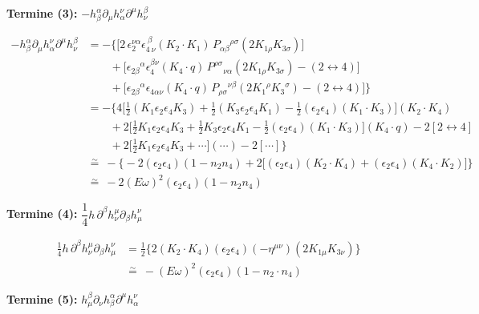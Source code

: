 \documentclass[11pt]{article}
\begin{document}
\bigskip
\noindent\textbf{Termine (3):} $-h_\beta^\alpha\partial_\mu h_\alpha^\nu\partial^\mu h_\nu^\beta$

\begin{align*}
-h_\beta^\alpha\partial_\mu h_\alpha^\nu\partial^\mu h_\nu^\beta
&= -\Big\{\big[2\,\epsilon_2^{\nu\alpha}\epsilon_{4\ \nu}^{\ \beta}(K_2\!\cdot\!K_1)\,P_{\alpha\beta}{}^{\rho\sigma}(2K_{1\rho}K_{3\sigma})\big] \\
&\qquad +\big[\epsilon_{2\beta}{}^{\alpha}\epsilon_4^{\beta\nu}(K_4\!\cdot\! q)\,P^{\rho\sigma}{}_{\nu\alpha}(2K_{1\rho}K_{3\sigma})-(2\leftrightarrow4)\big] \\
&\qquad +\big[\epsilon_{2\beta}{}^{\alpha}\epsilon_{4\alpha\nu}(K_4\!\cdot\! q)\,P_{\rho\sigma}{}^{\nu\beta}(2K_1{}^\rho K_3{}^\sigma)-(2\leftrightarrow4)\big]\Big\} \\[4pt]
&= -\Big\{4\Big[\tfrac12(K_1\epsilon_2\epsilon_4K_3)+\tfrac12(K_3\epsilon_2\epsilon_4K_1)-\tfrac12(\epsilon_2\epsilon_4)(K_1\!\cdot\!K_3)\Big](K_2\!\cdot\!K_4) \\
&\qquad +2\Big[\tfrac12K_1\epsilon_2\epsilon_4K_3+\tfrac12K_3\epsilon_2\epsilon_4K_1-\tfrac12(\epsilon_2\epsilon_4)(K_1\!\cdot\!K_3)\Big](K_4\!\cdot\! q)-2[2\leftrightarrow4] \\
&\qquad +2\Big[\tfrac12K_1\epsilon_2\epsilon_4K_3+\cdots\Big](\cdots)-2[\cdots]\Big\} \\[4pt]
&\overset{\sim}{=}\ -\Big\{-2(\epsilon_2\epsilon_4)(1-n_2n_4)+2\big[(\epsilon_2\epsilon_4)(K_2\!\cdot\!K_4)+(\epsilon_2\epsilon_4)(K_4\!\cdot\!K_2)\big]\Big\} \\[4pt]
&\overset{\sim}{=}\ -2(E\omega)^2(\epsilon_2\epsilon_4)(1-n_2n_4)
\end{align*}

\bigskip
\noindent\textbf{Termine (4):} $\dfrac{1}{4} h\, \partial^\beta h_\nu^\mu \partial_\beta h_\mu^\nu$

\begin{align*}
\frac14 h\,\partial^\beta h_\nu^\mu \partial_\beta h_\mu^\nu
&= \frac12\Big\{2(K_2\!\cdot\!K_4)(\epsilon_2\epsilon_4)(-\eta^{\mu\nu})(2K_{1\mu}K_{3\nu})\Big\} \\
&\overset{\sim}{=}\ -(E\omega)^2(\epsilon_2\epsilon_4)(1-n_2\cdot n_4)
\end{align*}

\bigskip
\noindent\textbf{Termine (5):} $h_\mu^\beta \partial_\nu h_\beta^\alpha \partial^\mu h_\alpha^\nu$
\end{document}
